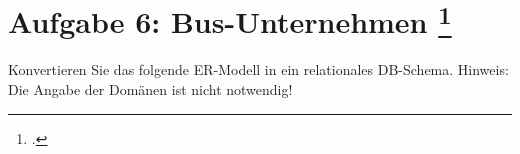 \documentclass{bschlangaul-aufgabe}
\begin{document}

\section{Aufgabe 6: Bus-Unternehmen
\footcite{db:ab:klausurvorbereitung}}

Konvertieren Sie das folgende ER-Modell in ein relationales DB-Schema.
Hinweis: Die Angabe der Domänen ist nicht notwendig!
\end{document}
